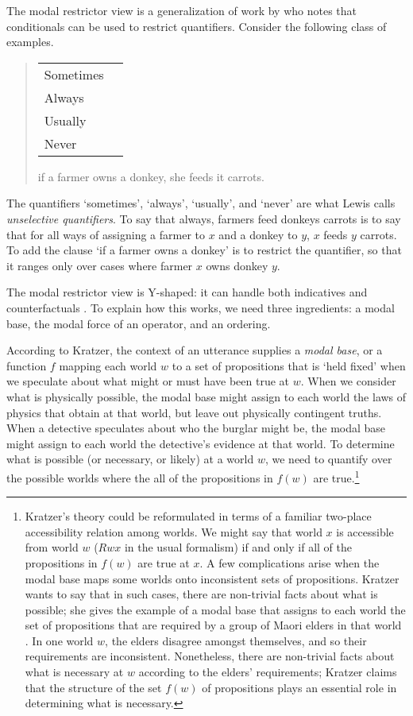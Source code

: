 The modal restrictor view is a generalization of work by  \citet{lewis-adverbs} who notes that conditionals can be used to restrict quantifiers.  Consider the following class of examples.
\begin{quote}
\begin{tabular}{ll}
Sometimes\\
Always\\
Usually\\
Never
\end{tabular}
 if a farmer owns a donkey, she feeds it carrots.
\end{quote}
The quantifiers `sometimes', `always', `usually', and `never' are what Lewis calls \emph{unselective quantifiers}.  To say that always, farmers feed donkeys carrots is to say that for all ways of assigning a farmer to $x$ and a donkey to $y$, $x$ feeds $y$ carrots.  To add the clause `if a farmer owns a donkey' is to restrict the quantifier, so that it ranges only over cases where farmer $x$ owns donkey $y$.

The modal restrictor view is Y-shaped: it can handle both indicatives and counterfactuals \citep{kratzer-notional-modality}.  To explain how this works, we need three ingredients: a modal base, the modal force of an operator, and an ordering.

According to Kratzer, the context of an utterance supplies a \emph{modal base}, or a function $f$ mapping each world $w$ to a set of propositions that is `held fixed' when we speculate about what might or must have been true at $w$.   When we consider what is physically possible, the modal base might assign to each world the laws of physics that obtain at that world, but leave out physically contingent truths.  When a detective speculates about who the burglar might be, the modal base might assign to each world the detective's evidence at that world.  To determine what is possible (or necessary, or likely) at a world $w$, we need to quantify over the possible worlds where the all of the propositions in $f(w)$ are true.\footnote{Kratzer's theory could be reformulated in terms of a familiar two-place accessibility relation among worlds. We might say that world $x$ is accessible from world $w$ ($Rwx$ in the usual formalism) if and only if  all of the propositions in $f(w)$ are true at $x$.   A few complications arise when the modal base maps some worlds onto inconsistent sets of propositions.   Kratzer wants to say that in such cases, there are non-trivial facts about what is possible; she gives the example of a modal base that assigns to each world the set of propositions that are required by a group of Maori elders in that world \citep[16-20]{kratzer-notional-modality}.  In one world $w$, the elders disagree amongst themselves, and so their requirements are inconsistent.  Nonetheless, there are non-trivial facts about what is necessary at $w$ according to the elders' requirements; Kratzer claims that the structure of the set $f(w)$ of propositions plays an essential role in determining what is necessary.}


